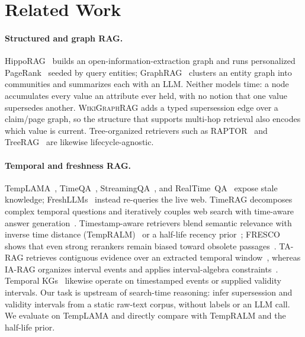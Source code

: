 \documentclass[letterpaper]{article}
\theoremstyle{plain}
\newcommand{\ours}{\textsc{WikiGraphRAG}}
\begin{document}
\section{Related Work}
\label{sec:related}

\paragraph{Structured and graph RAG.} HippoRAG~\citep{gutierrez2024hipporag} builds an open-information-extraction graph and runs personalized PageRank~\citep{haveliwala2002topic} seeded by query entities; GraphRAG~\citep{edge2024graphrag} clusters an entity graph into communities and summarizes each with an LLM. Neither models time: a node accumulates every value an attribute ever held, with no notion that one value supersedes another. \ours{} adds a typed supersession edge over a claim/page graph, so the structure that supports multi-hop retrieval also encodes which value is current. Tree-organized retrievers such as RAPTOR~\citep{sarthi2024raptor} and TreeRAG~\citep{tao2025treerag} are likewise lifecycle-agnostic.

\paragraph{Temporal and freshness RAG.} TempLAMA~\citep{dhingra2022templama}, TimeQA~\citep{chen2021timeqa}, StreamingQA~\citep{liska2022streamingqa}, and RealTime~QA~\citep{kasai2023realtimeqa} expose stale knowledge; FreshLLMs~\citep{vu2024freshllms} instead re-queries the live web. TimeRAG decomposes complex temporal questions and iteratively couples web search with time-aware answer generation~\citep{wang2025timerag}. Timestamp-aware retrievers blend semantic relevance with inverse time distance (TempRALM)~\citep{gade2024tempralm} or a half-life recency prior~\citep{grofsky2025ragtime}; FRESCO shows that even strong rerankers remain biased toward obsolete passages~\citep{an2026fresco}. TA-RAG retrieves contiguous evidence over an extracted temporal window~\citep{lau2025tarag}, whereas IA-RAG organizes interval events and applies interval-algebra constraints~\citep{wang2026iarag}. Temporal KGs~\citep{trivedi2017knowevolve,lacroix2020tensor} likewise operate on timestamped events or supplied validity intervals. Our task is upstream of search-time reasoning: infer supersession and validity intervals from a static raw-text corpus, without labels or an LLM call. We evaluate on TempLAMA and directly compare with TempRALM and the half-life prior.
\end{document}
